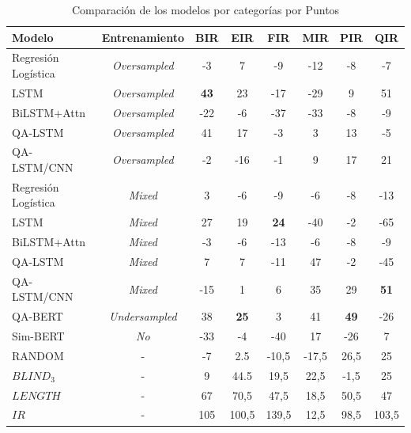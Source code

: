 \begin{table}[!ht]
  \begin{center}
    \caption{Comparación de los modelos por categorías por Puntos}
    \begin{tabular}{l|c|c|c|c|c|c|c}
      \textbf{Modelo} & \textbf{Entrenamiento} & \textbf{BIR} & \textbf{EIR} & \textbf{FIR} & \textbf{MIR} & \textbf{PIR} & \textbf{QIR}\\
      \hline
      Regresión Logística & \textit{Oversampled} & -3 & 7 & -9 & -12 & -8 & -7 \\
      LSTM & \textit{Oversampled} & \textbf{43} & 23 & -17 & -29 & 9 & 51\\
      BiLSTM+Attn & \textit{Oversampled} & -22 & -6 & -37 & -33 & -8 & -9\\
      QA-LSTM & \textit{Oversampled} & 41 & 17 & -3 & 3 & 13 & -5\\
      QA-LSTM/CNN & \textit{Oversampled} & -2 & -16 & -1 & 9 & 17 & 21\\

      Regresión Logística & \textit{Mixed} & 3 & -6 & -9 & -6 & -8 & -13\\
      LSTM & \textit{Mixed} & 27 & 19 & \textbf{24} & -40 & -2 & -65\\
      BiLSTM+Attn & \textit{Mixed} & -3 & -6 & -13 & -6 & -8 & -9 \\
      QA-LSTM & \textit{Mixed} & 7 & 7 & -11 & 47 & -2 & -45 \\
      QA-LSTM/CNN & \textit{Mixed} & -15 & 1 & 6 & 35 & 29 & \textbf{51} \\

      QA-BERT & \textit{Undersampled} & 38 & \textbf{25} & 3 & 41 & \textbf{49} & -26 \\
      Sim-BERT & \textit{No} & -33 & -4 & -40 & 17 & -26 & 7 \\
      \hline
      RANDOM & - & -7 & 2.5 & -10,5 & -17,5 & 26,5 & 25 \\
      $BLIND_3$ & - & 9 & 44.5 & 19,5 & 22,5 & -1,5 & 25 \\
      $LENGTH$ & - & 67 & 70,5 & 47,5 & 18,5 & 50,5 & 47 \\
      $IR$ & - & 105 & 100,5 & 139,5 & 12,5 & 98,5 & 103,5 \\
    \end{tabular}
  \end{center}
  \label{comparison_points}
\end{table}

